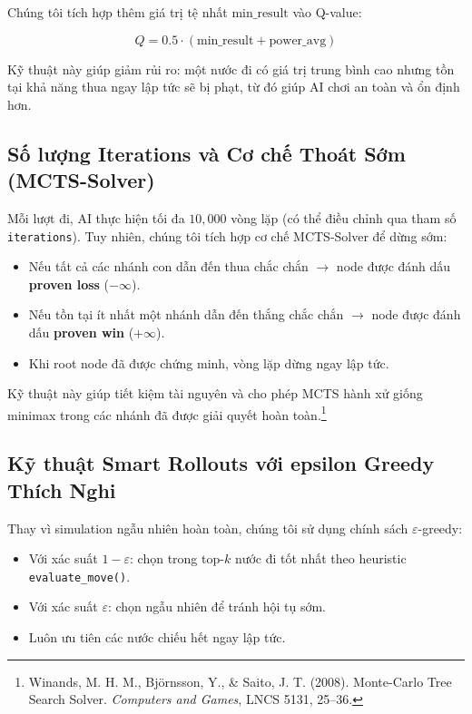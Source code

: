 Chúng tôi tích hợp thêm giá trị tệ nhất $\text{min\_result}$ vào Q-value:

\begin{equation}
Q = 0.5 \cdot (\text{min\_result} + \text{power\_avg})
\end{equation}

Kỹ thuật này giúp giảm rủi ro: một nước đi có giá trị trung bình cao nhưng tồn tại khả năng thua ngay lập tức sẽ bị phạt, từ đó giúp AI chơi an toàn và ổn định hơn.

\subsection{Số lượng Iterations và Cơ chế Thoát Sớm (MCTS-Solver)}

Mỗi lượt đi, AI thực hiện tối đa $10{,}000$ vòng lặp (có thể điều chỉnh qua tham số \texttt{iterations}). Tuy nhiên, chúng tôi tích hợp cơ chế MCTS-Solver để dừng sớm:

\begin{itemize}
    \item Nếu tất cả các nhánh con dẫn đến thua chắc chắn $\rightarrow$ node được đánh dấu \textbf{proven loss} ($-\infty$).
    \item Nếu tồn tại ít nhất một nhánh dẫn đến thắng chắc chắn $\rightarrow$ node được đánh dấu \textbf{proven win} ($+\infty$).
    \item Khi root node đã được chứng minh, vòng lặp dừng ngay lập tức.
\end{itemize}

Kỹ thuật này giúp tiết kiệm tài nguyên và cho phép MCTS hành xử giống minimax trong các nhánh đã được giải quyết hoàn toàn.\footnote{Winands, M. H. M., Björnsson, Y., \& Saito, J. T. (2008). Monte-Carlo Tree Search Solver. \textit{Computers and Games}, LNCS 5131, 25–36.}

\subsection{Kỹ thuật Smart Rollouts với epsilon \- Greedy Thích Nghi}

Thay vì simulation ngẫu nhiên hoàn toàn, chúng tôi sử dụng chính sách $\varepsilon$-greedy:

\begin{itemize}
    \item Với xác suất $1 - \varepsilon$: chọn trong top-$k$ nước đi tốt nhất theo heuristic \texttt{evaluate\_move()}.
    \item Với xác suất $\varepsilon$: chọn ngẫu nhiên để tránh hội tụ sớm.
    \item Luôn ưu tiên các nước chiếu hết ngay lập tức.
\end{itemize}

